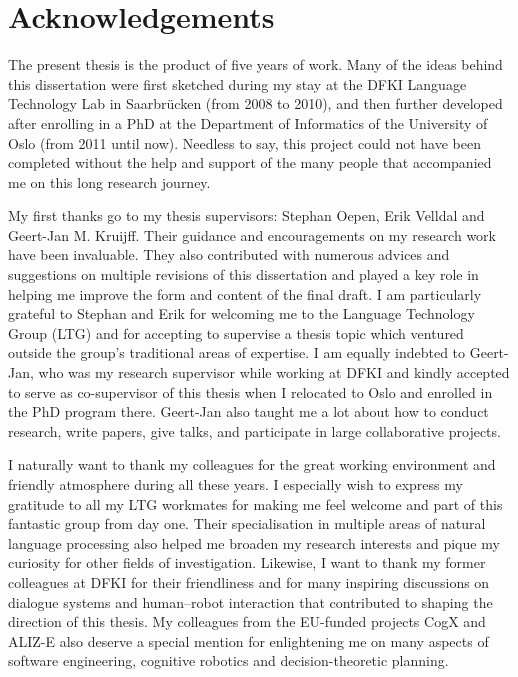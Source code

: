 \chapter*{Acknowledgements}

The present thesis is the product of five years of work. Many of the ideas behind this dissertation were first sketched during my stay at the DFKI Language Technology Lab in Saarbr\"ucken (from 2008 to 2010), and then further developed after enrolling in a PhD at the Department of Informatics of the University of Oslo (from 2011 until now).  Needless to say, this project could not have been completed without the help and support of the many people that accompanied me on this long research journey.

My first thanks go to my thesis supervisors: Stephan Oepen, Erik Velldal and Geert-Jan M. Kruijff.  Their guidance and encouragements on my research work have been invaluable.  They also contributed with numerous advices and suggestions on multiple revisions of this dissertation and played a key role in helping me improve the form and content of the final draft. I am particularly grateful to Stephan and Erik for welcoming me to the Language Technology Group (LTG) and for accepting to supervise a thesis topic which ventured outside the group's traditional areas of expertise. I am equally indebted to Geert-Jan, who was my research supervisor while working at DFKI and kindly accepted to serve as co-supervisor of this thesis when I relocated to Oslo and enrolled in the PhD program there. Geert-Jan  also taught me a lot about how to conduct research, write papers, give talks, and participate in large collaborative projects.

I naturally want to thank my colleagues for the great working environment and friendly atmosphere during all these years.  I especially wish to express my gratitude to all my LTG workmates for making me feel welcome and part of this fantastic group from day one. Their specialisation in multiple areas of natural language processing also helped me broaden my research interests and pique my curiosity for other fields of investigation.  Likewise, I want to thank my former colleagues at DFKI for their friendliness and for many inspiring discussions on dialogue systems and human--robot interaction that contributed to shaping the direction of this thesis. My colleagues from the EU-funded projects CogX and ALIZ-E also deserve a special mention for enlightening me on many aspects of software engineering, cognitive robotics and decision-theoretic planning.

